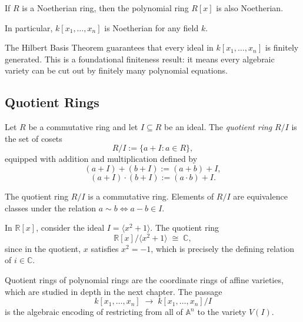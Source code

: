 \begin{theorem}
If $R$ is a Noetherian ring, then the polynomial ring $R[x]$
is also Noetherian.

In particular, $k[x_1, \dots, x_n]$ is Noetherian for any field $k$.
\end{theorem}

\begin{remark}
The Hilbert Basis Theorem guarantees that every ideal in
$k[x_1, \dots, x_n]$ is finitely generated.
This is a foundational finiteness result:
it means every algebraic variety can be cut out by
finitely many polynomial equations.
\end{remark}

\subsection{Quotient Rings}

\begin{definition}
Let $R$ be a commutative ring and let $I \subseteq R$ be an ideal.
The \emph{quotient ring} $R/I$ is the set of cosets
\[
R/I := \{ a + I : a \in R \},
\]
equipped with addition and multiplication defined by
\[
(a + I) + (b + I) := (a + b) + I,
\]
\[
(a + I) \cdot (b + I) := (a \cdot b) + I.
\]
\end{definition}

\begin{remark}
The quotient ring $R/I$ is a commutative ring.
Elements of $R/I$ are equivalence classes under the relation
$a \sim b \iff a - b \in I$.
\end{remark}

\begin{example}
In $\mathbb{R}[x]$, consider the ideal $I = \langle x^2 + 1 \rangle$.
The quotient ring
\[
\mathbb{R}[x] / \langle x^2 + 1 \rangle \;\cong\; \mathbb{C},
\]
since in the quotient, $x$ satisfies $x^2 = -1$,
which is precisely the defining relation of $i \in \mathbb{C}$.
\end{example}

\begin{remark}
Quotient rings of polynomial rings are the coordinate rings
of affine varieties, which are studied in depth in the next chapter.
The passage
\[
k[x_1,\dots,x_n] \;\longrightarrow\; k[x_1,\dots,x_n]/I
\]
is the algebraic encoding of restricting from all of $\mathbb{A}^n$
to the variety $V(I)$.
\end{remark}